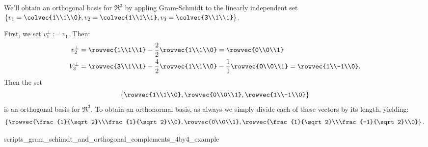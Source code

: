 \begin{example}
We'll  obtain an orthogonal basis for $\Re^3$ by appling Gram-Schmidt to the linearly independent set 
$\left\{ v_1=\colvec{1\\1\\0}, v_2=\colvec{1\\1\\1},v_3=\colvec{3\\1\\1} \right\}$.

First, we set $v_1^\perp:=v_1$.  Then:
\begin{align*}
v_2^\perp&= \rowvec{1\\1\\1} - \frac{2}{2}\rowvec{1\\1\\0} = \rowvec{0\\0\\1} \\
V_3^\perp&= \rowvec{3\\1\\1} - \frac{4}{2}\rowvec{1\\1\\0} - \frac{1}{1}\rowvec{0\\0\\1} = \rowvec{1\\-1\\0}. 
\end{align*}
Then the set
\[
\left\{ \rowvec{1\\1\\0},\rowvec{0\\0\\1},\rowvec{1\\-1\\0}\right\}
\]
is an orthogonal basis for $\Re^3$.  To obtain an orthonormal basis, as always we simply divide each of these vectors by its length, yielding:
\[
\left\{ \rowvec{\frac{1}{\sqrt2}\\\frac{1}{\sqrt2}\\0},\rowvec{0\\0\\1},\rowvec{\frac{1}{\sqrt2}\\\frac{-1}{\sqrt2}\\0}\right\}.
\]
\end{example}

 {scripts_gram_schimdt_and_orthogonal_complements_4by4_example}

